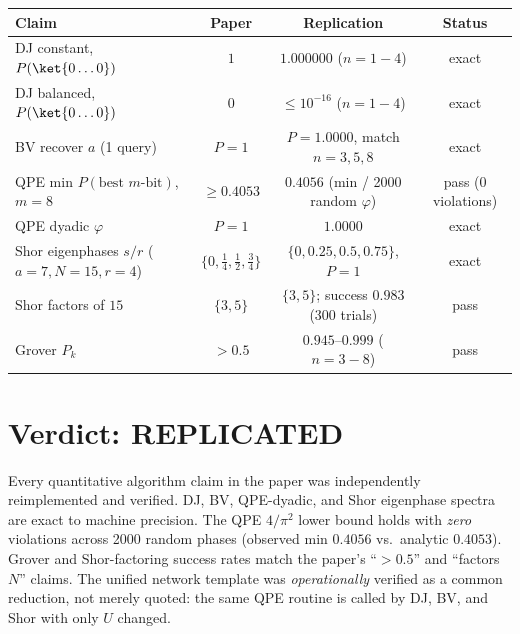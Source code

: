 \documentclass[11pt]{article}
\begin{document}
\begin{center}
\begin{tabular}{lccc}
\toprule
Claim & Paper & Replication & Status \\
\midrule
DJ constant, $P(\ket{0\ldots 0})$              & $1$              & $1.000000$ ($n{=}1{-}4$)          & exact \\
DJ balanced, $P(\ket{0\ldots 0})$              & $0$              & $\le 10^{-16}$ ($n{=}1{-}4$)      & exact \\
BV recover $a$ (1 query)                       & $P{=}1$          & $P{=}1.0000$, match $n{=}3,5,8$  & exact \\
QPE min $P(\text{best }m\text{-bit})$, $m{=}8$ & $\ge 0.4053$     & $0.4056$ (min / 2000 random $\varphi$) & pass (0 violations) \\
QPE dyadic $\varphi$                           & $P{=}1$          & $1.0000$                          & exact \\
Shor eigenphases $s/r$ ($a{=}7,N{=}15,r{=}4$)  & $\{0,\tfrac14,\tfrac12,\tfrac34\}$ & $\{0,0.25,0.5,0.75\}$, $P{=}1$ & exact \\
Shor factors of $15$                           & $\{3,5\}$        & $\{3,5\}$; success $0.983$ (300 trials) & pass \\
Grover $P_{k}$                                 & $>0.5$           & $0.945$--$0.999$ ($n{=}3{-}8$)   & pass \\
\bottomrule
\end{tabular}
\end{center}

\section{Verdict: REPLICATED}
Every quantitative algorithm claim in the paper was independently
reimplemented and verified. DJ, BV, QPE-dyadic, and Shor eigenphase spectra
are exact to machine precision. The QPE $4/\pi^{2}$ lower bound holds with
\emph{zero} violations across 2000 random phases (observed min $0.4056$ vs.\
analytic $0.4053$). Grover and Shor-factoring success rates match the paper's
``$>0.5$'' and ``factors $N$'' claims. The unified network template was
\emph{operationally} verified as a common reduction, not merely quoted:
the same QPE routine is called by DJ, BV, and Shor with only $U$ changed.
\end{document}

